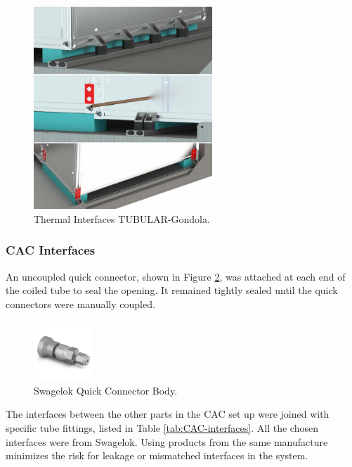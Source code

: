 \begin{figure}[H]
    \centering
    \includegraphics[width=0.6\textwidth]{4-experiment-design/img/Mechanical/gondola_fixation.jpg}
    \caption{Thermal Interfaces TUBULAR-Gondola.}
    \label{fig:thermal_interface}
\end{figure}

\subsubsection{CAC Interfaces}
An uncoupled quick connector, shown in Figure \ref{fig:Quick-connector-body}, was attached at each end of the coiled tube to seal the opening. It remained tightly sealed until the quick connectors were manually coupled. 

\begin{figure}[H]
    \centering
    \includegraphics[width=0.2\textwidth]{4-experiment-design/img/Mechanical/CAC-QC-Outlet.jpg}
    \caption{Swagelok Quick Connector Body.}
    \label{fig:Quick-connector-body}
\end{figure}

The interfaces between the other parts in the CAC set up were joined with specific tube fittings, listed in Table \ref{tab:CAC-interfaces}. All the chosen interfaces were from Swagelok. Using products from the same manufacture minimizes the risk for leakage or mismatched interfaces in the system. 

